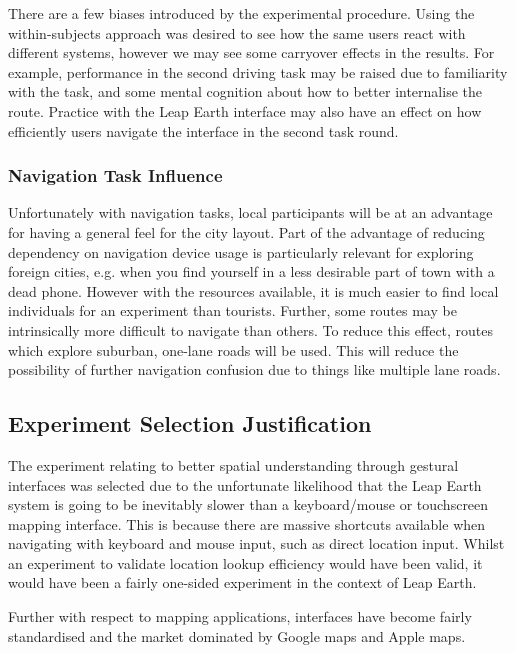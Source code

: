 \documentclass{sigplanconf}
\begin{document}
There are a few biases introduced by the experimental procedure. Using the within-subjects approach was desired to see how the same users react with different systems, however we may see some carryover effects in the results. For example, performance in the second driving task may be raised due to familiarity with the task, and some mental cognition about how to better internalise the route. Practice with the Leap Earth interface may also have an effect on how efficiently users navigate the interface in the second task round.

\subsubsection{Navigation Task Influence}

Unfortunately with navigation tasks, local participants will be at an advantage for having a general feel for the city layout. Part of the advantage of reducing dependency on navigation device usage is particularly relevant for exploring foreign cities, e.g. when you find yourself in a less desirable part of town with a dead phone. However with the resources available, it is much easier to find local individuals for an experiment than tourists. Further, some routes may be intrinsically more difficult to navigate than others. To reduce this effect, routes which explore suburban, one-lane roads will be used. This will reduce the possibility of further navigation confusion due to things like multiple lane roads.

\subsection{Experiment Selection Justification}

The experiment relating to better spatial understanding through gestural interfaces was selected due to the unfortunate likelihood that the Leap Earth system is going to be inevitably slower than a keyboard/mouse or touchscreen mapping interface. This is because there are massive shortcuts available when navigating with keyboard and mouse input, such as direct location input. Whilst an experiment to validate location lookup efficiency would have been valid, it would have been a fairly one-sided experiment in the context of Leap Earth. 

Further with respect to mapping applications, interfaces have become fairly standardised and the market dominated by Google maps and Apple maps. 




\end{document}
